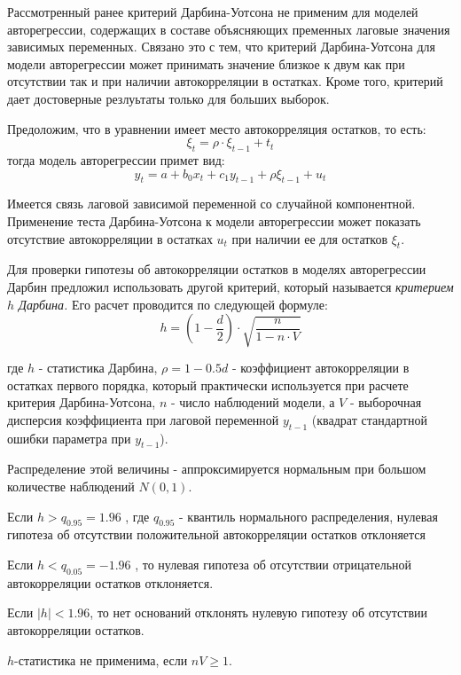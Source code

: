 \documentclass[aps,%
12pt,%
final,%
oneside,
onecolumn,%
musixtex, %
superscriptaddress,%
centertags]{article} %
\theoremstyle{plain}
\theoremstyle{definition}
\theoremstyle{remark}
\begin{document}
Рассмотренный ранее критерий Дарбина-Уотсона не применим для моделей авторегрессии, содержащих в составе объясняющих пременных лаговые значения зависимых переменных. Связано это с тем, что критерий Дарбина-Уотсона для модели авторегрессии может принимать значение близкое к двум как при отсутствии так и при наличии автокорреляции в остатках. Кроме того, критерий дает достоверные резлуьтаты только для больших выборок.

Предоложим, что в уравнении имеет место автокорреляция остатков, то есть:
$$\xi_t = \rho \cdot \xi_{t-1} + t_t$$
тогда модель авторегрессии примет вид:
$$y_t = a + b_0x_t + c_1y_{t-1} + \rho \xi_{t-1} + u_t$$

Имеется связь лаговой зависимой переменной со случайной компонентной. Применение теста Дарбина-Уотсона к модели авторегрессии может показать отсутствие автокорреляции в остатках $u_t$ при наличии ее для остатков $\xi_t$.

Для проверки гипотезы об автокорреляции остатков в моделях авторегрессии Дарбин предложил использовать другой критерий, который называется \textit{критерием $h$ Дарбина.} Его расчет проводится по следующей формуле:
$$h = \left(1 - \frac{d}{2}\right) \cdot \sqrt {\frac{n}{1-n \cdot V}}$$

где $h$ - статистика Дарбина, $\rho = 1 - 0.5d$ - коэффициент автокорреляции в остатках первого порядка, который практически используется при расчете критерия Дарбина-Уотсона, $n$ - число наблюдений модели, а $V$ - выборочная дисперсия коэффициента при лаговой переменной $y_{t-1}$ (квадрат стандартной ошибки параметра при $y_{t-1}$).

Распределение этой величины - аппроксимируется нормальным при большом количестве наблюдений $N(0,1)$.

Если $h>q_{0.95} = 1.96$ , где $q_{0.95}$ - квантиль нормального распределения, нулевая гипотеза об отсутствии положительной автокорреляции остатков отклоняется

Если $h<q_{0.05} = -1.96$ , то нулевая гипотеза об отсутствии отрицательной автокорреляции остатков отклоняется.

Если $|h| < 1.96$, то нет оснований отклонять нулевую гипотезу об отсутствии автокорреляции остатков.

$h$-статистика не применима, если $nV \geq 1$.
\end{document}
